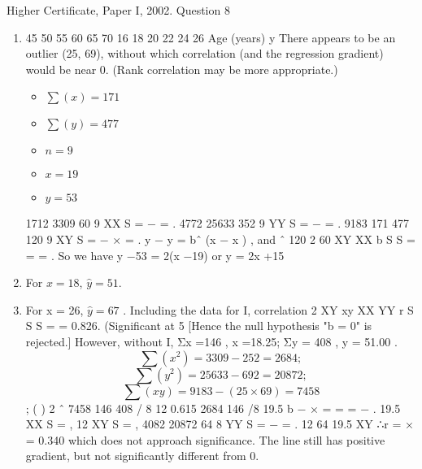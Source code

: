 \documentclass[a4paper,12pt]{article}
\begin{document}
Higher Certificate, Paper I, 2002. Question 8
\begin{enumerate}
    \item 
45
50
55
60
65
70
16 18 20 22 24 26
Age (years)
y
There appears to be an outlier (25, 69), without which correlation (and the regression
gradient) would be near 0. (Rank correlation may be more appropriate.)
\begin{multicols}{3}
\begin{itemize}
\item $\sum(x) =171$ 
\item $\sum(y) = 477$ 
\item $n = 9$ 
\item $x =19$ 
\item $y = 53$
\end{itemize}
\end{multicols}
1712 3309 60
9 XX S = − = .
4772 25633 352
9 YY S = − = . 9183 171 477 120
9 XY S = − × = .
y − y = bˆ (x − x ) , and ˆ 120 2
60
XY
XX
b S
S
= = = .
So we have y −53 = 2(x −19) or y = 2x +15
\item For $x = 18$, $\hat{y} = 51$. 

\item For x = 26, $\hat{y} = 67$ .
Including the data for I, correlation
2
XY
xy
XX YY
r S
S S
= = 0.826. (Significant at 5%
[Hence the null hypothesis "b = 0" is rejected.]
However, without I, Σx =146 , x =18.25; Σy = 408 , y = 51.00 .
\[\sum(x^2) = 3309 - 252 = 2684 ;\] 
\[\sum(y^2) = 25633- 692 = 20872 ;\]
\[\sum(xy) = 9183- (25 \times 69) = 7458\]; ( )
2
ˆ 7458 146 408 / 8 12 0.615
2684 146 /8 19.5
b
− ×
= = =
−
.
19.5 XX S = , 12 XY S = ,
4082 20872 64
8 YY S = − = .
12
64 19.5 XY ∴r =
×
= 0.340 which does not approach significance. The line still has
positive gradient, but not significantly different from 0.
\end{enumerate}
\end{document}

